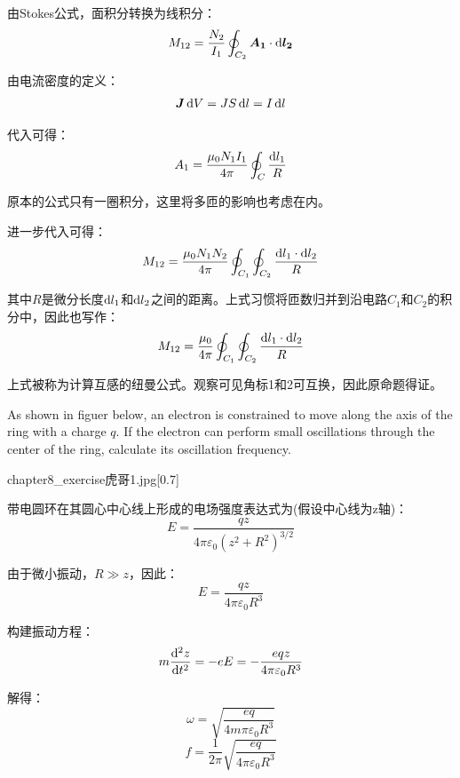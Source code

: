 \begin{solution}
    由Stokes公式，面积分转换为线积分：
    \[M_{12} = \dfrac{N_2}{I_1}\oint_{C_2} \vec{A_1}\cdot\dif{\vec{l_2}}\]

    由电流密度的定义：
    \[\vec{J}\dif{V} = JS\dif{l} = I\dif{l}\]

    代入可得：
    \[A_1 = \dfrac{\mu_0 N_1 I_1}{4\pi}\oint_{C} \dfrac{\dif{l_1}}{R}\]
    
    原本的公式只有一圈积分，这里将多匝的影响也考虑在内。

    进一步代入可得：
    \[M_{12} =\dfrac{\mu_0 N_1 N_2}{4\pi}\oint_{C_1}\oint_{C_2} \dfrac{\dif{l_1}\cdot\dif{l_2}}{R}\]

    其中$R$是微分长度$\dif{l_1}$和$\dif{l_2}$之间的距离。上式习惯将匝数归并到沿电路$C_1$和$C_2$的积分中，因此也写作：
    \[M_{12} =\dfrac{\mu_0}{4\pi}\oint_{C_1}\oint_{C_2} \dfrac{\dif{l_1}\cdot\dif{l_2}}{R}\]

    上式被称为计算互感的纽曼公式。观察可见角标1和2可互换，因此原命题得证。
\end{solution}

\begin{solution}
    As shown in figuer below, an electron is constrained to move along the axis of the ring with a charge \( q \). If the 
    electron can perform small oscillations through the center of the ring, calculate its oscillation frequency.
    \begin{singlefigure}{chapter8_exercise虎哥1.jpg}[0.7]
    \end{singlefigure}
    \tcbrule

    带电圆环在其圆心中心线上形成的电场强度表达式为(假设中心线为z轴)：
    \[E = \dfrac{qz}{4\pi\varepsilon_0(z^2 + R^2)^{3/2}}\]

    由于微小振动，$R\gg z$，因此：
    \[E = \dfrac{qz}{4\pi\varepsilon_0R^3}\]

    构建振动方程：
    \[m\dfrac{\dif^2 z}{\dif t^2} = -eE = -\dfrac{eqz}{4\pi\varepsilon_0R^3}\]

    解得：
    \[\omega = \sqrt{\dfrac{eq}{4m\pi\varepsilon_0 R^3}}\]
    \[f = \dfrac{1}{2\pi}\sqrt{\dfrac{eq}{4\pi\varepsilon_0R^3}}\]
\end{solution}

